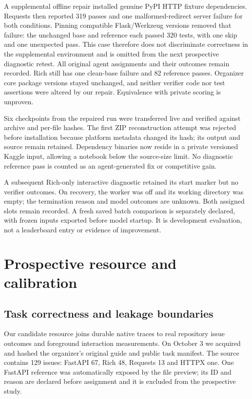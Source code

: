 \documentclass[10pt,twocolumn]{article}
\begin{document}
A supplemental offline repair installed genuine PyPI HTTP fixture dependencies.
Requests then reported 319 passes and one malformed-redirect server failure for
both conditions. Pinning compatible Flask/Werkzeug versions removed that failure:
the unchanged base and reference each passed 320 tests, with one skip and one
unexpected pass. This case therefore does not discriminate correctness in the
supplemental environment and is omitted from the next prospective diagnostic
retest. All original agent assignments and their outcomes remain recorded.
Rich still has one clean-base failure and 82 reference passes. Organizer core
package versions stayed unchanged, and neither verifier code nor test assertions
were altered by our repair. Equivalence with private scoring is unproven.

Six checkpoints from the repaired run were transferred live and verified against
archive and per-file hashes. The first ZIP reconstruction attempt was rejected
before installation because platform metadata changed its hash; its output and
source remain retained. Dependency binaries now reside in a private versioned
Kaggle input, allowing a notebook below the source-size limit. No diagnostic
reference pass is counted as an agent-generated fix or competitive gain.

A subsequent Rich-only interactive diagnostic retained its start marker but no
verifier outcomes. On recovery, the worker was off and its working directory
was empty; the termination reason and model outcomes are unknown. Both assigned
slots remain recorded. A fresh saved batch comparison is separately declared,
with frozen inputs exported before model startup. It is development evaluation,
not a leaderboard entry or evidence of improvement.

\section{Prospective resource and calibration}
\subsection{Task correctness and leakage boundaries}
Our candidate resource joins durable native traces to real repository issue
outcomes and foreground interaction measurements. On October 3 we acquired and
hashed the organizer's original guide and public task manifest. The source
contains 129 issues: FastAPI 67, Rich 48, Requests 13 and HTTPX one. One FastAPI
reference was automatically exposed by the file preview; its ID and reason are
declared before assignment and it is excluded from the prospective study.
\end{document}
